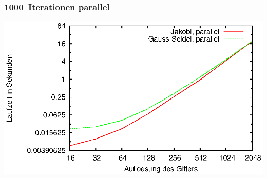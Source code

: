 \documentclass{beamer}
\begin{document}
\begin{frame}
    \frametitle{1000~Iterationen parallel}
    \includegraphics[width=\textwidth]{plots/laufzeitenparallel}
\end{frame}
\end{document}
